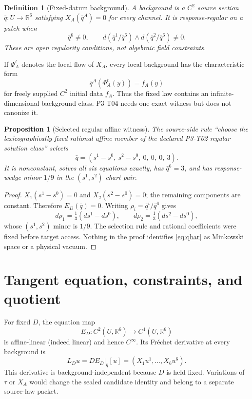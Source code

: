 \documentclass[11pt]{article}
\newtheorem{definition}{Definition}
\newtheorem{proposition}{Proposition}
\newcommand{\RR}{\mathbb{R}}
\newcommand{\qbar}{\bar q}
\newcommand{\Lop}{L_D}
\begin{document}
\begin{definition}[Fixed-datum background]
A background is a $C^2$ source section $\qbar:U\to\RR^6$ satisfying
$X_A(\qbar^A)=0$ for every channel.  It is response-regular on a patch when
\[
 \qbar^6\ne0,
 \qquad
 d(\qbar^1/\qbar^6)\wedge d(\qbar^2/\qbar^6)\ne0.
\]
These are open regularity conditions, not algebraic field constraints.
\end{definition}

If $\Phi_A^t$ denotes the local flow of $X_A$, every local background has the
characteristic form
\[
 \qbar^A\!\left(\Phi_A^t(y)\right)=f_A(y)
\]
for freely supplied $C^2$ initial data $f_A$.  Thus the fixed law contains an
infinite-dimensional background class.  P3-T04 needs one exact witness but
does not canonize it.

\begin{proposition}[Selected regular affine witness]
The source-side rule ``choose the lexicographically fixed rational affine
member of the declared P3-T02 regular solution class'' selects
\begin{equation}
 \qbar=(s^1-s^0,\ s^2-s^0,\ 0,\ 0,\ 0,\ 3).
 \label{eq:qbar}
\end{equation}
It is nonconstant, solves all six equations exactly, has $\qbar^6=3$, and has
response-wedge minor $1/9$ in the $(s^1,s^2)$ chart pair.
\end{proposition}

\begin{proof}
$X_1(s^1-s^0)=0$ and $X_2(s^2-s^0)=0$; the remaining components are constant.
Therefore $E_D(\qbar)=0$.  Writing
$\rho_i=\qbar^i/\qbar^6$ gives
\[
 d\rho_1=\tfrac13(ds^1-ds^0),\qquad
 d\rho_2=\tfrac13(ds^2-ds^0),
\]
whose $(s^1,s^2)$ minor is $1/9$.  The selection rule and rational
coefficients were fixed before target access.  Nothing in the proof identifies
\eqref{eq:qbar} as Minkowski space or a physical vacuum.
\end{proof}

\section{Tangent equation, constraints, and quotient}

For fixed $D$, the equation map
\[
 E_D:C^2(U,\RR^6)\longrightarrow C^1(U,\RR^6)
\]
is affine-linear (indeed linear) and hence $C^\infty$.  Its Fr\'echet derivative
at every background is
\begin{equation}
 \Lop u=DE_D|_{\qbar}[u]
   =(X_1u^1,\ldots,X_6u^6).
 \label{eq:linearization}
\end{equation}
This derivative is background-independent because $D$ is held fixed.
Variations of $\tau$ or $X_A$ would change the sealed candidate identity and
belong to a separate source-law packet.
\end{document}
